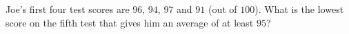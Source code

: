 Joe's first four test scores are $96$, $94$, $97$ and $91$ (out of $100$). What is the lowest score on the fifth test that gives him an average of at least $95$?
